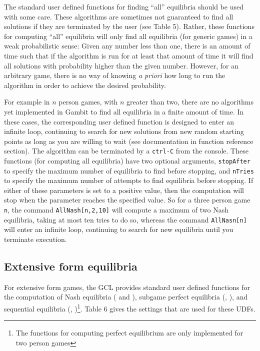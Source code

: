 The standard user defined functions for finding ``all'' equilibria
should be used with some care.  These algorithms are sometimes not
guaranteed to find all solutions if they are terminated by the user
(see Table 5).  Rather, these functions for computing ``all''
equilibria will only find all equilibria (for generic games) in a weak
probabilistic sense: Given any number less than one, there is an
amount of time such that if the algorithm is run for at least that amount of
time it will find all solutions with probability higher than the given
number.  However, for an arbitrary game, there is no way of knowing
{\it a priori} how long to run the algorithm in order to achieve the
desired probability.  

For example in $n$ person games, with $n$ greater than two, there are
no algorithms yet implemented in Gambit to find all equilibria in a
finite amount of time.  In these cases, the corresponding user defined
function is designed to enter an infinite loop, continuing to search
for new solutions from new random starting points as long as you are
willing to wait (see documentation in function reference section).
The algorithm can be terminated by a \verb+ctrl-C+ from the console.
These functions (for computing all equilibria) have two optional
arguments, \verb+stopAfter+ to specify the maximum number of
equilibria to find before stopping, and \verb+nTries+ to specify the
maximum number of attempts to find equilibria before stopping. If
either of these parameters is set to a positive value, then the
computation will stop when the parameter reaches the specified value.
So for a three person game \verb+n+, the command
\verb+AllNash[n,2,10]+ will compute a maximum of two Nash equilibria,
taking at most ten tries to do so, whereas the command
\verb+AllNasn[n]+ will enter an infinite loop, continuing to search
for new equilibria until you terminate execution.

\subsection{Extensive form equilibria}

For extensive form games, the GCL provides standard user defined
functions for the computation of Nash equilibria ( and ), subgame perfect
equilibria (, ), and sequential
equilibria (,
)\footnote{The functions for computing perfect
equilibrium are only implemented for two person games}.  Table 6 gives
the settings that are used for these UDFs.  

